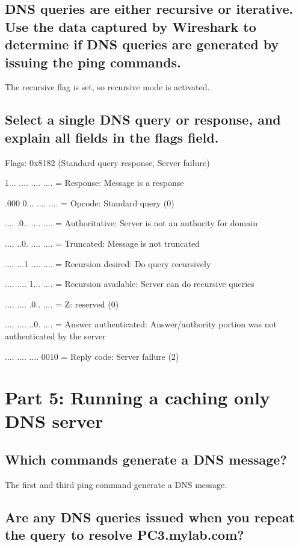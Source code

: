 \documentclass[a4paper, 11pt]{article}
\begin{document}
\subsection {DNS queries are either recursive or iterative. Use the data captured by Wireshark to determine if DNS queries are generated by issuing the ping commands. }

The recursive flag is set, so recursive mode is activated.

\subsection {Select a single DNS query or response, and explain all fields in the flags field.  }

Flags: 0x8182 (Standard query response, Server failure)


1... .... .... .... = Response: Message is a response

.000 0... .... .... = Opcode: Standard query (0)

.... .0.. .... .... = Authoritative: Server is not an authority for domain

.... ..0. .... .... = Truncated: Message is not truncated

.... ...1 .... .... = Recursion desired: Do query recursively

.... .... 1... .... = Recursion available: Server can do recursive queries

.... .... .0.. .... = Z: reserved (0)

.... .... ..0. .... = Answer authenticated: Answer/authority portion was not authenticated by the server

.... .... .... 0010 = Reply code: Server failure (2)


\section{Part 5: Running a caching only DNS server}

\subsection {Which commands generate a DNS message? }

The first and third ping command generate a DNS message.

\subsection {Are any DNS queries issued when you repeat the query to resolve PC3.mylab.com? }
\end{document}
